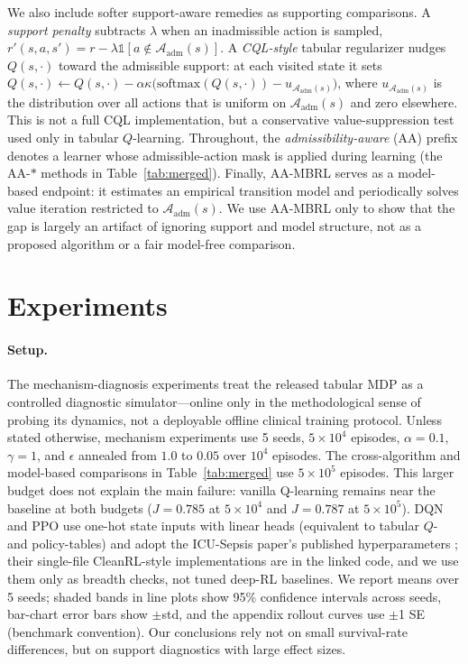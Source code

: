 \documentclass{article}
\newcommand{\Adm}{\mathcal{A}_{\mathrm{adm}}}
\begin{document}
We also include softer support-aware remedies as supporting comparisons. A
\emph{support penalty} subtracts $\lambda$ when an inadmissible action is sampled,
$r'(s,a,s')=r-\lambda\mathbb{1}[a\notin\Adm(s)]$. A \emph{CQL-style} tabular
regularizer nudges $Q(s,\cdot)$ toward the admissible support: at each visited
state it sets $Q(s,\cdot)\leftarrow Q(s,\cdot)-\alpha\kappa\big(\mathrm{softmax}(Q(s,\cdot))-u_{\Adm(s)}\big)$,
where $u_{\Adm(s)}$ is the distribution over all actions that is uniform on
$\Adm(s)$ and zero elsewhere. This is not a full CQL
implementation, but a conservative value-suppression test used only in tabular
$Q$-learning. Throughout, the
\emph{admissibility-aware} (AA) prefix denotes a learner whose admissible-action
mask is applied during learning (the AA-$\ast$ methods in Table~\ref{tab:merged}).
Finally, AA-MBRL serves as a model-based endpoint: it estimates an empirical transition
model and periodically solves value iteration restricted to $\Adm(s)$. We use
AA-MBRL only to show that the gap is largely an artifact of ignoring support and
model structure, not as a proposed algorithm or a fair model-free comparison.

\section{Experiments}
\label{sec:experiments}
\paragraph{Setup.}
The mechanism-diagnosis experiments treat the released tabular MDP as a controlled
diagnostic simulator---online only in the methodological sense of probing its
dynamics, not a deployable offline clinical training protocol.
Unless stated otherwise, mechanism experiments use 5 seeds,
$5{\times}10^4$ episodes, $\alpha{=}0.1$, $\gamma{=}1$, and
$\epsilon$ annealed from $1.0$ to $0.05$ over $10^4$ episodes.
The cross-algorithm and model-based comparisons in Table~\ref{tab:merged} use
$5{\times}10^5$ episodes. This larger budget does not explain the main failure:
vanilla Q-learning remains near the baseline at both budgets
($J{=}0.785$ at $5{\times}10^4$ and $J{=}0.787$ at
$5{\times}10^5$). DQN and PPO use one-hot state inputs with linear heads
(equivalent to tabular $Q$- and policy-tables) and adopt the ICU-Sepsis paper's
published hyperparameters \citep{choudhary2024icusepsis}; their single-file
CleanRL-style implementations are in the linked code, and we use them only as
breadth checks, not tuned deep-RL baselines. We report means over 5 seeds; shaded bands in line plots show 95\% confidence
intervals across seeds, bar-chart error bars show $\pm$std, and the appendix
rollout curves use $\pm$1 SE (benchmark convention). Our conclusions rely not on
small survival-rate differences, but on support diagnostics with large effect
sizes.
\end{document}
